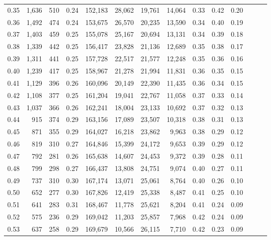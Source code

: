 \begin{tabular}{rrrrrrrrrrrrrr}
0.35 &  1,636 &  510 &  0.24 &  152,183 &   28,062 &  19,761 &  14,064 &  0.33 &  0.42 &      0.20 \\
0.36 &  1,492 &  474 &  0.24 &  153,675 &   26,570 &  20,235 &  13,590 &  0.34 &  0.40 &      0.19 \\
0.37 &  1,403 &  459 &  0.25 &  155,078 &   25,167 &  20,694 &  13,131 &  0.34 &  0.39 &      0.18 \\
0.38 &  1,339 &  442 &  0.25 &  156,417 &   23,828 &  21,136 &  12,689 &  0.35 &  0.38 &      0.17 \\
0.39 &  1,311 &  441 &  0.25 &  157,728 &   22,517 &  21,577 &  12,248 &  0.35 &  0.36 &      0.16 \\
0.40 &  1,239 &  417 &  0.25 &  158,967 &   21,278 &  21,994 &  11,831 &  0.36 &  0.35 &      0.15 \\
0.41 &  1,129 &  396 &  0.26 &  160,096 &   20,149 &  22,390 &  11,435 &  0.36 &  0.34 &      0.15 \\
0.42 &  1,108 &  377 &  0.25 &  161,204 &   19,041 &  22,767 &  11,058 &  0.37 &  0.33 &      0.14 \\
0.43 &  1,037 &  366 &  0.26 &  162,241 &   18,004 &  23,133 &  10,692 &  0.37 &  0.32 &      0.13 \\
0.44 &    915 &  374 &  0.29 &  163,156 &   17,089 &  23,507 &  10,318 &  0.38 &  0.31 &      0.13 \\
0.45 &    871 &  355 &  0.29 &  164,027 &   16,218 &  23,862 &   9,963 &  0.38 &  0.29 &      0.12 \\
0.46 &    819 &  310 &  0.27 &  164,846 &   15,399 &  24,172 &   9,653 &  0.39 &  0.29 &      0.12 \\
0.47 &    792 &  281 &  0.26 &  165,638 &   14,607 &  24,453 &   9,372 &  0.39 &  0.28 &      0.11 \\
0.48 &    799 &  298 &  0.27 &  166,437 &   13,808 &  24,751 &   9,074 &  0.40 &  0.27 &      0.11 \\
0.49 &    737 &  310 &  0.30 &  167,174 &   13,071 &  25,061 &   8,764 &  0.40 &  0.26 &      0.10 \\
0.50 &    652 &  277 &  0.30 &  167,826 &   12,419 &  25,338 &   8,487 &  0.41 &  0.25 &      0.10 \\
0.51 &    641 &  283 &  0.31 &  168,467 &   11,778 &  25,621 &   8,204 &  0.41 &  0.24 &      0.09 \\
0.52 &    575 &  236 &  0.29 &  169,042 &   11,203 &  25,857 &   7,968 &  0.42 &  0.24 &      0.09 \\
0.53 &    637 &  258 &  0.29 &  169,679 &   10,566 &  26,115 &   7,710 &  0.42 &  0.23 &      0.09 \\

\end{tabular}
